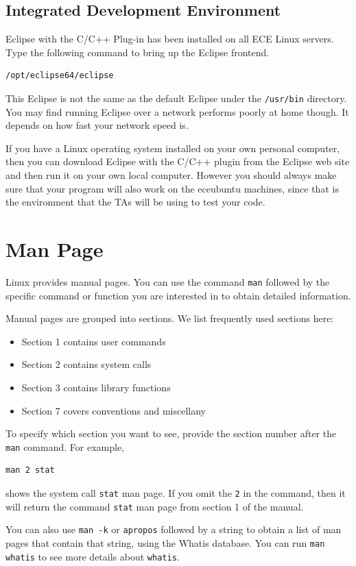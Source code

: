 
\subsection{Integrated Development Environment}
Eclipse with the C/C++ Plug-in has been installed on all ECE Linux servers. Type the following command to bring up the Eclipse frontend.
\begin{lstlisting}[style=bash]
/opt/eclipse64/eclipse
\end{lstlisting}
This Eclipse is not the same as the default Eclipse under the \verb+/usr/bin+ directory. You may find running Eclipse over a network performs poorly at home though. It depends on how fast your network speed is. 

If you have a Linux operating system installed on your own personal computer, then you can download Eclipse with the C/C++ plugin from the Eclipse web site and then run it on your own local computer. However you should always make sure that your program will also work on the eceubuntu machines, since that is the environment that the TAs will be using to test your code.

\section{Man Page}
Linux provides manual pages. You can use the command \verb+man+ followed by the specific command or function you are interested in to obtain detailed information. 

Manual pages are grouped into sections. We list frequently used sections here: 
\begin{itemize}
\item Section 1 contains user commands
\item Section 2 contains system calls
\item Section 3 contains library functions
\item Section 7 covers conventions and miscellany
\end{itemize}

To specify which section you want to see, provide the section number after the \verb+man+ command. For example,
\begin{lstlisting}[style=bash]
man 2 stat
\end{lstlisting}
shows the system call \verb+stat+ man page. If you omit the \verb+2+ in the command, then it will return the command \verb+stat+ man page from section 1 of the manual.

You can also use \verb+man -k+  or \verb+apropos+ followed by a string to obtain a list of man pages that contain that string, using the Whatis database. You can run \verb+man whatis+ to see more details about \verb+whatis+.

